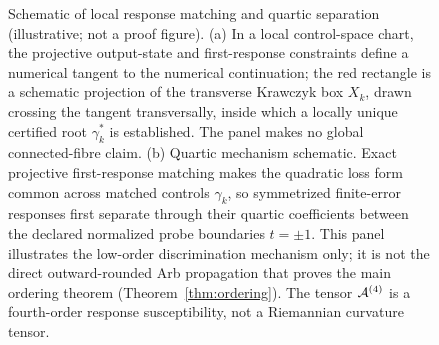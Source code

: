 \begin{figure}[t]
\caption{Schematic of local response matching and quartic separation (illustrative; not a
proof figure). (a) In a local control-space chart, the projective output-state and
first-response constraints define a numerical tangent to the numerical continuation; the
red rectangle is a schematic projection of the transverse Krawczyk box $X_{k}$, drawn
crossing the tangent transversally, inside which a locally unique certified root
$\gamma_{k}^{*}$ is established. The panel makes no global connected-fibre claim.
(b) Quartic mechanism schematic. Exact projective first-response matching makes the
quadratic loss form common across matched controls $\gamma_{k}$, so symmetrized
finite-error responses first separate through their quartic coefficients between the
declared normalized probe boundaries $t=\pm1$. This panel illustrates the low-order
discrimination mechanism only; it is not the direct outward-rounded Arb propagation that
proves the main ordering theorem (Theorem~\ref{thm:ordering}). The tensor $\mathcal{A}^{(4)}$ is a
fourth-order response susceptibility, not a Riemannian curvature tensor.}
\label{fig:schematic}
\end{figure}
